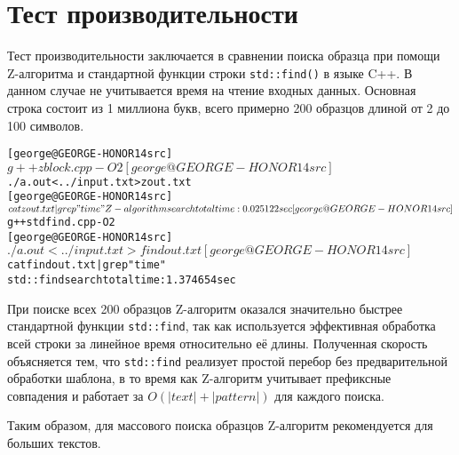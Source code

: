 \section{Тест производительности}
Тест производительности заключается в сравнении поиска образца при помощи Z-алгоритма и стандартной функции строки \texttt{std::find()} в языке C++. В данном случае не учитывается время на чтение входных данных. Основная строка состоит из 1 миллиона букв, всего примерно 200 образцов длиной от 2 до 100 символов.

\begin{alltt}
[george@GEORGE-HONOR14 src]$ g++ zblock.cpp -O2
[george@GEORGE-HONOR14 src]$ ./a.out < ../input.txt > zout.txt
[george@GEORGE-HONOR14 src]$ cat zout.txt | grep "time"
Z-algorithm search total time: 0.025122 sec
[george@GEORGE-HONOR14 src]$ g++ stdfind.cpp -O2
[george@GEORGE-HONOR14 src]$ ./a.out < ../input.txt > findout.txt
[george@GEORGE-HONOR14 src]$ cat findout.txt | grep "time"
std::find search total time: 1.374654 sec
\end{alltt}

При поиске всех 200 образцов Z-алгоритм оказался значительно быстрее стандартной функции \texttt{std::find}, так как используется эффективная обработка всей строки за линейное время относительно её длины. Полученная скорость объясняется тем, что \texttt{std::find} реализует простой перебор без предварительной обработки шаблона, в то время как Z-алгоритм учитывает префиксные совпадения и работает за $O(|text| + |pattern|)$ для каждого поиска. 

Таким образом, для массового поиска образцов Z-алгоритм рекомендуется для больших текстов.

\pagebreak

